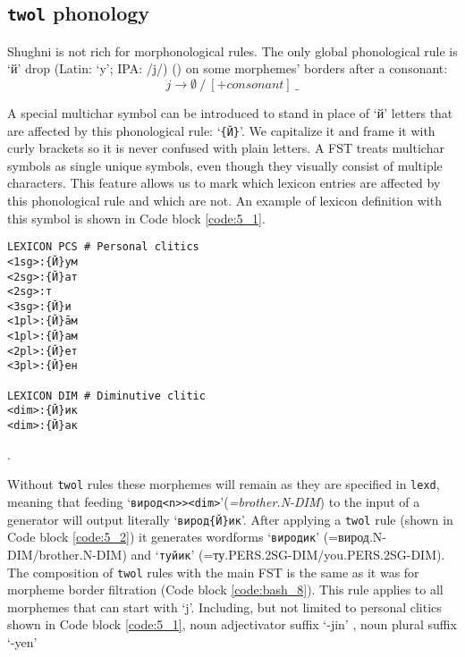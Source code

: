 \subsection{\texttt{twol} phonology}
Shughni is not rich for morphonological rules. The only global phonological rule is `й' drop (Latin: `y'; IPA: /j/) () on some morphemes' borders after a consonant:
\[
j \rightarrow \emptyset 
\ /\ 
[+consonant]
\ \_
\]


A special multichar symbol can be introduced to stand in place of `й' letters that are affected by this phonological rule: `\texttt{\{Й\}}'. We capitalize it and frame it with curly brackets so it is never confused with plain letters. A FST treats multichar symbols as single unique symbols, even though they visually consist of multiple characters. This feature allows us to mark which lexicon entries are affected by this phonological rule and which are not. An example of lexicon definition with this symbol is shown in Code block \ref{code:5_1}.

\begin{code_frame}[float]
    \begin{footnotesize}
    \begin{verbatim}
LEXICON PCS # Personal clitics
<1sg>:{Й}ум
<2sg>:{Й}ат
<2sg>:т
<3sg>:{Й}и
<1pl>:{Й}āм
<1pl>:{Й}ам
<2pl>:{Й}ет
<3pl>:{Й}ен

LEXICON DIM # Diminutive clitic
<dim>:{Й}ик
<dim>:{Й}ак
    \end{verbatim}
    \end{footnotesize}
    \tcblower
    \label{code:5_1}
\end{code_frame}

.

Without \texttt{twol} rules these morphemes will remain as they are specified in \texttt{lexd}, meaning that feeding `\texttt{вирод<n>><dim>}'(\textit{=brother.N-DIM}) to the input of a generator will output literally `\texttt{вирод\{Й\}ик}'. After applying a \texttt{twol} rule (shown in Code block \ref{code:5_2}) it generates wordforms `\texttt{виродик}' (=вирод.N-DIM/brother.N-DIM) and `\texttt{туйик}' (=ту.PERS.2SG-DIM/you.PERS.2SG-DIM). The composition of \texttt{twol} rules with the main FST is the same as it was for morpheme border filtration (Code block \ref{code:bash_8}). This rule applies to all morphemes that can start with `j'. Including, but not limited to personal clitics shown in Code block \ref{code:5_1}, noun adjectivator suffix `-jin' \parencite[168]{parker_shughni_2023}, noun plural suffix `-yen'

